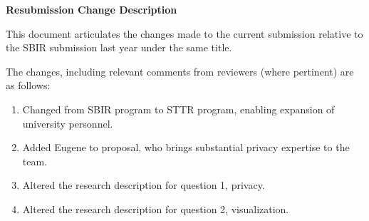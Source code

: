 \documentclass[11pt]{article}
\begin{document}
\pagestyle{plain}
\thispagestyle{plain}

\begin{center}
\textbf{\Large Resubmission Change Description}
\end{center}

This document articulates the changes made to the current submission relative
to the SBIR submission last year under the same title.

The changes, including relevant comments from reviewers (where pertinent)
are as follows:

\begin{enumerate}

\item Changed from SBIR program to STTR program, enabling expansion of
university personnel.

\item Added Eugene to proposal, who brings substantial privacy expertise
to the team.

\item Altered the research description for question 1, privacy.

\item Altered the research description for question 2, visualization.

\end{enumerate}
\end{document}
